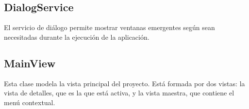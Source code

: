 \subsection{DialogService}
El servicio de diálogo permite mostrar ventanas emergentes según sean necesitadas durante la ejecución 
de la aplicación.

\subsection{MainView}
Esta clase modela la vista principal del proyecto. Está formada por dos vistas: la vista de detalles, 
que es la que está activa, y la vista maestra, que contiene el menú contextual.
